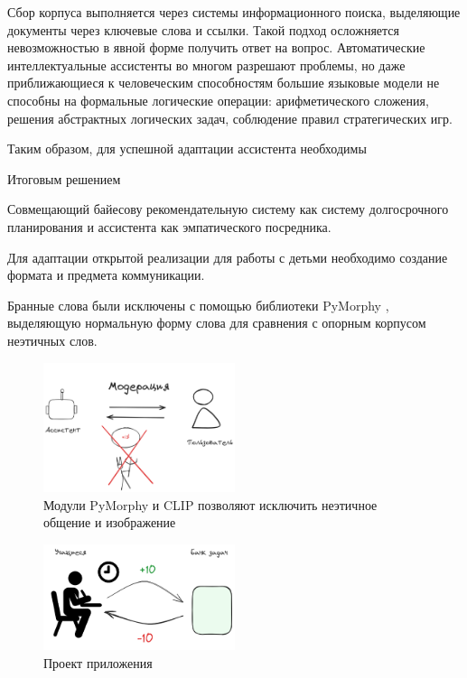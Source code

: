 Сбор корпуса выполняется через системы информационного поиска, выделяющие документы через
ключевые слова и ссылки. Такой подход осложняется невозможностью в явной форме получить ответ на вопрос.  
Автоматические интеллектуальные ассистенты во многом разрешают проблемы, но даже приближающиеся к человеческим способностям
большие языковые модели не способны на формальные логические операции: арифметического сложения, решения абстрактных логических задач, соблюдение 
правил стратегических игр.

Таким образом, для успешной адаптации ассистента необходимы

Итоговым решением

Совмещающий байесову рекомендательную систему как систему долгосрочного планирования и ассистента как эмпатического посредника.



Для адаптации открытой реализации для работы с детьми необходимо создание формата и предмета коммуникации.

Бранные слова были исключены с помощью библиотеки PyMorphy \cite{Korobov2015morph}, выделяющую нормальную форму слова для сравнения
с опорным корпусом неэтичных слов.

\begin{figure}[h]
    \centering
    \includegraphics[width=0.5\textwidth]{assets/work/arch/detox.excalidraw.png}
    \caption{Модули PyMorphy \cite{Korobov2015morph} и CLIP позволяют исключить неэтичное общение и изображение }
    \label{detox}
\end{figure}




\begin{figure}[h]
    \centering
    \includegraphics[width=0.5\textwidth]{assets/work/arch/recommendation.excalidraw.png}
    \caption{Проект приложения}
    \label{arch}
\end{figure}

